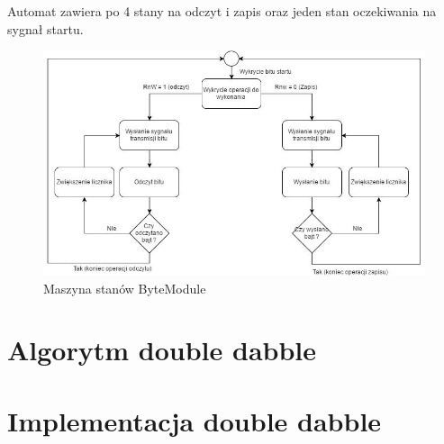 \documentclass[a4paper]{article}
\begin{document}
Automat zawiera po 4 stany na odczyt i zapis oraz jeden stan oczekiwania na sygnał startu.

\begin{figure}[!h]
\begin{center}
\includegraphics[width=15cm]{graphics/byte_module_fsm.png}
\end{center}
\caption{Maszyna stanów ByteModule}
\label{bte_module_fsm}
\end{figure}

\section{Algorytm double dabble}
\section{Implementacja double dabble}
\end{document}
